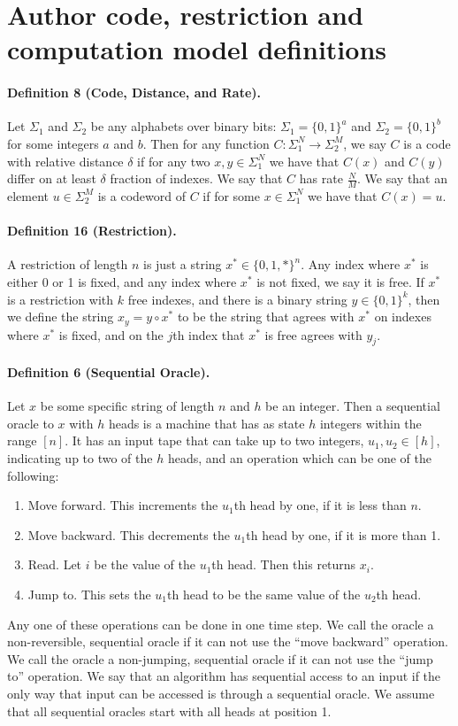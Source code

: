 \section*{Author code, restriction and computation model definitions}
\paragraph{Definition 8 (Code, Distance, and Rate).} Let $\Sigma_1$ and $\Sigma_2$ be any alphabets over binary bits: $\Sigma_1=\{0,1\}^a$ and $\Sigma_2=\{0,1\}^b$ for some integers $a$ and $b$. Then for any function $C:\Sigma_1^N\to\Sigma_2^M$, we say $C$ is a code with relative distance $\delta$ if for any two $x,y\in\Sigma_1^N$ we have that $C(x)$ and $C(y)$ differ on at least $\delta$ fraction of indexes.
We say that $C$ has rate $\frac NM$. We say that an element $u\in\Sigma_2^M$ is a codeword of $C$ if for some $x\in\Sigma_1^N$ we have that $C(x)=u$.
\paragraph{Definition 16 (Restriction).} A restriction of length $n$ is just a string $x^*\in\{0,1,*\}^n$. Any index where $x^*$ is either 0 or 1 is fixed, and any index where $x^*$ is not fixed, we say it is free.
If $x^*$ is a restriction with $k$ free indexes, and there is a binary string $y\in\{0,1\}^k$, then we define the string $x_y=y\circ x^*$ to be the string that agrees with $x^*$ on indexes where $x^*$ is fixed, and on the $j$th index that $x^*$ is free agrees with $y_j$.
\paragraph{Definition 6 (Sequential Oracle).} Let $x$ be some specific string of length $n$ and $h$ be an integer. Then a sequential oracle to $x$ with $h$ heads is a machine that has as state $h$ integers within the range $[n]$. It has an input tape that can take up to two integers, $u_1,u_2\in[h]$, indicating up to two of the $h$ heads, and an operation which can be one of the following:
\begin{enumerate}
\item Move forward. This increments the $u_1$th head by one, if it is less than $n$.
\item Move backward. This decrements the $u_1$th head by one, if it is more than 1.
\item Read. Let $i$ be the value of the $u_1$th head. Then this returns $x_i$.
\item Jump to. This sets the $u_1$th head to be the same value of the $u_2$th head.
\end{enumerate}
Any one of these operations can be done in one time step.
We call the oracle a non-reversible, sequential oracle if it can not use the ``move backward'' operation.
We call the oracle a non-jumping, sequential oracle if it can not use the ``jump to'' operation.
We say that an algorithm has sequential access to an input if the only way that input can be accessed is through a sequential oracle.
We assume that all sequential oracles start with all heads at position 1.
